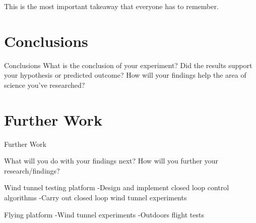 \documentclass[aspectratio=169]{beamer}            %
\begin{document}
\begin{frame}[plain]
  This is the most important takeaway that everyone has to remember.
\end{frame}

\section{Conclusions}
\begin{frame}{Conclusions}
  What is the conclusion of your experiment?
  Did the results support your hypothesis or predicted outcome?
  How will your findings help the area of science you’ve researched?
\end{frame}

\section{Further Work}
\begin{frame}{Further Work}

  What will you do with your findings next?
  How will you further your research/findings?

  Wind tunnel testing platform
  -Design and implement closed loop control algorithms
  -Carry out closed loop wind tunnel experiments
  
  Flying platform
  -Wind tunnel experiments
  -Outdoors flight tests
  
\end{frame}

\end{document}
